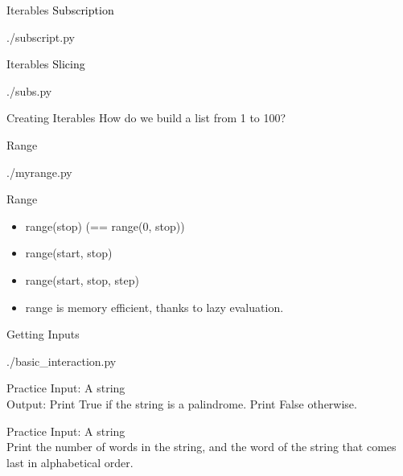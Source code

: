\documentclass{beamer}
\begin{document}
\begin{frame}{Iterables}
  \textcolor{black}{\large{Subscription}}
  \begin{lstinputlisting}
    {./subscript.py}
  \end{lstinputlisting}
\end{frame}

\begin{frame}{Iterables}
  \textcolor{black}{\large{Slicing}}
  \begin{lstinputlisting}
    {./subs.py}
  \end{lstinputlisting}
\end{frame}

\begin{frame}{Creating Iterables}
  How do we build a list from 1 to 100?
\end{frame}

\begin{frame}{Range}
  \begin{lstinputlisting}
    {./myrange.py}
  \end{lstinputlisting}
\end{frame}

\begin{frame}{Range}
  \begin{itemize}
    \item range(stop) (== range(0, stop))
    \item range(start, stop)
    \item range(start, stop, step)
    \item range is memory efficient, thanks to lazy evaluation.
  \end{itemize}
\end{frame}

\begin{frame}{Getting Inputs}
  \begin{lstinputlisting}
    {./basic_interaction.py}
  \end{lstinputlisting}
\end{frame}

\begin{frame}{Practice}
  Input: A string\\
  Output: Print True if the string is a palindrome. Print False otherwise.
\end{frame}

\begin{frame}{Practice}
  Input: A string\\
  Print the number of words in the string, and the word of the string that comes last in
  alphabetical order.
\end{frame}
\end{document}
